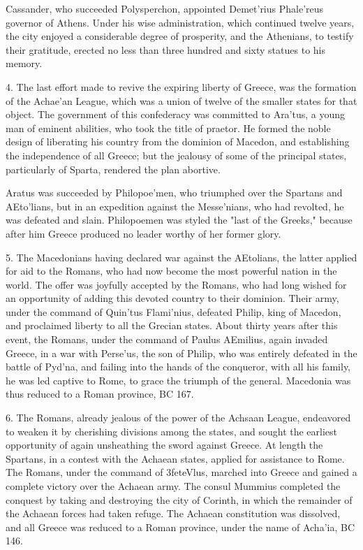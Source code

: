 \documentclass[openany,a4paper]{memoir}
\begin{document}
Cassander, who succeeded Polysperchon, appointed Demet'rius Phale'reus governor of Athens. Under his wise 
administration, which continued twelve years, the city enjoyed a considerable degree of prosperity, and the Athenians, 
to testify their gratitude, erected no less than three hundred 
and sixty statues to his memory. 

4. The last effort made to revive the expiring liberty of 
Greece, was the formation of the Achae'an League, which 
was a union of twelve of the smaller states for that object. The 
government of this confederacy was committed to Ara'tus, a 
young man of eminent abilities, who took the title of praetor. 
He formed the noble design of liberating his country from 
the dominion of Macedon, and establishing the independence 
of all Greece; but the jealousy of some of the principal 
states, particularly of Sparta, rendered the plan abortive. 

Aratus was succeeded by Philopoe'men, who triumphed over 
the Spartans and AEto'lians, but in an expedition against the 
Messe'nians, who had revolted, he was defeated and slain. 
Philopoemen was styled the "last of the Greeks," because 
after him Greece produced no leader worthy of her former 
glory. 

5. The Macedonians having declared war against the AEtolians, the latter applied for aid to the Romans, who had now 
become the most powerful nation in the world. The offer 
was joyfully accepted by the Romans, who had long wished 
for an opportunity of adding this devoted country to their 
dominion. Their army, under the command of Quin'tus 
Flami'nius, defeated Philip, king of Macedon, and proclaimed 
liberty to all the Grecian states. About thirty years after this 
event, the Romans, under the command of Paulus AEmilius, 
again invaded Greece, in a war with Perse'us, the son of 
Philip, who was entirely defeated in the battle of Pyd'na, 
and failing into the hands of the conqueror, with all his family, 
he was led captive to Rome, to grace the triumph of the 
general. Macedonia was thus reduced to a Roman province, 
BC 167. 

6. The Romans, already jealous of the power of the Achsaan 
League, endeavored to weaken it by cherishing divisions 
among the states, and sought the earliest opportunity of 
again unsheathing the sword against Greece. At length the 
Spartans, in a contest with the Achaean states, applied for 
assistance to Rome. The Romans, under the command of 
3feteVlus, marched into Greece and gained a complete victory 
over the Achaean army. The consul Mummius completed 
the conquest by taking and destroying the city of Corinth, 
in which the remainder of the Achaean forces had taken refuge. The Achaean constitution was dissolved, and all Greece 
was reduced to a Roman province, under the name of Acha'ia, 
BC 146. 
\end{document}
